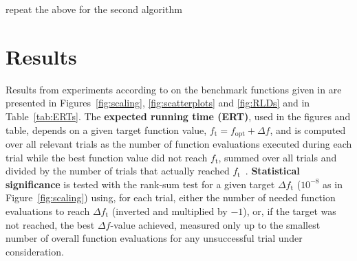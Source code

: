 \documentclass{sig-alternate}
\newcommand{\Df}{\ensuremath{\Delta f}}
\newcommand{\fopt}{\ensuremath{f_\mathrm{opt}}}
\newcommand{\ftarget}{\ensuremath{f_\mathrm{t}}}
\newcommand{\change}[1]{{\color{red} #1}}
\begin{document}
\change{repeat the above for the second algorithm}

\section{Results}

Results from experiments according to \cite{hansen2012exp} on the benchmark
functions given in \cite{wp200901_2010,hansen2012fun} are presented in
Figures~\ref{fig:scaling}, \ref{fig:scatterplots} and \ref{fig:RLDs} and
in Table~\ref{tab:ERTs}. The \textbf{expected running time (ERT)}, used in the figures and table, depends on a
given target function value, $\ftarget=\fopt+\Df$, and is computed over all relevant trials
as the number of function evaluations executed during each trial while the best
function value did not reach \ftarget, summed over all trials
and divided by the number of trials that actually reached \ftarget\
\cite{hansen2012exp,price1997dev}. 
\textbf{Statistical significance} is tested with the rank-sum test for a given
target $\Delta\ftarget$ ($10^{-8}$ as in Figure~\ref{fig:scaling}) using,
for each trial, either the number of needed function evaluations to reach
$\Delta\ftarget$ (inverted and multiplied by $-1$), or, if the target was not
reached, the best $\Df$-value achieved, measured only up to the smallest number
of overall function evaluations for any unsuccessful trial under consideration.



\end{document}
